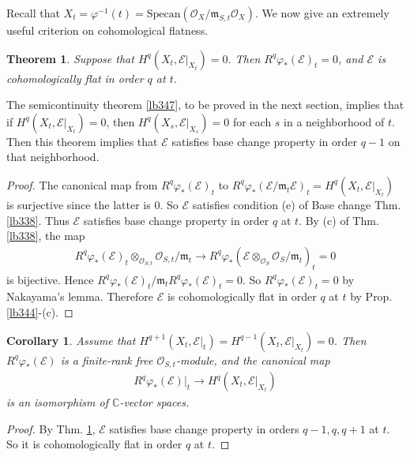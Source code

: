 \documentclass[12pt,b5paper,notitlepage]{report}
\theoremstyle{definition}
\theoremstyle{plain}
\newtheorem{thm}[df]{Theorem}
\newtheorem{co}[df]{Corollary}
\newcommand{\scr}{\mathscr}
\newcommand{\Cbb}{\mathbb C}
\newcommand{\Specan}{\mathrm{Specan}}
\newcommand{\mk}{\mathfrak m}
\numberwithin{equation}{section}
\begin{document}
Recall that $X_t=\varphi^{-1}(t)=\Specan(\scr O_X/\mk_{S,t}\scr O_X)$. We now give an extremely useful criterion on cohomological flatness.

\begin{thm}\label{lb345}
Suppose that $H^q(X_t,\scr E|_{X_t})=0$. Then $R^q\varphi_*(\scr E)_t=0$, and $\scr E$ is cohomologically flat in order $q$ at $t$.
\end{thm}

The semicontinuity theorem \ref{lb347}, to be proved in the next section, implies that if $H^q(X_t,\scr E|_{X_t})=0$, then $H^q(X_s,\scr E|_{X_s})=0$ for each $s$ in a neighborhood of $t$. Then this theorem implies that $\scr E$ satisfies base change property in order $q-1$ on that neighborhood.

\begin{proof}
The canonical map from $R^q\varphi_*(\scr E)_t$ to $R^q\varphi_*(\scr E/\mk_t\scr E)_t=H^q(X_t,\scr E|_{X_t})$ is surjective since the latter is $0$. So $\scr E$ satisfies condition (e) of Base change Thm. \ref{lb338}. Thus $\scr E$ satisfies base change property in order $q$ at $t$. By (c) of Thm. \ref{lb338}, the map
\begin{align*}
R^q\varphi_*(\scr E)_t\otimes_{\scr O_{S,t}}\scr O_{S,t}/\mk_t\rightarrow R^q\varphi_*(\scr E\otimes_{\scr O_S}\scr O_S/\mk_t)_t=0
\end{align*}
is bijective. Hence $R^q\varphi_*(\scr E)_t/\mk_t R^q\varphi_*(\scr E)_t=0$. So $R^q\varphi_*(\scr E)_t=0$ by Nakayama's lemma. Therefore $\scr E$ is cohomologically flat in order $q$ at $t$ by Prop. \ref{lb344}-(c).
\end{proof}

\begin{co}\label{lb359}
Assume that $H^{q+1}(X_t,\scr E|_t)=H^{q-1}(X_t,\scr E|_{X_t})=0$. Then $R^q\varphi_*(\scr E)$ is a finite-rank free $\scr O_{S,t}$-module, and the canonical map
\begin{align*}
R^q\varphi_*(\scr E)|_t\rightarrow H^q(X_t,\scr E|_{X_t})
\end{align*}
is an isomorphism of $\Cbb$-vector spaces.
\end{co}
\begin{proof}
By Thm. \ref{lb345}, $\scr E$ satisfies base change property in orders $q-1,q,q+1$ at $t$. So it is cohomologically flat in order $q$ at $t$.
\end{proof}
\end{document}
